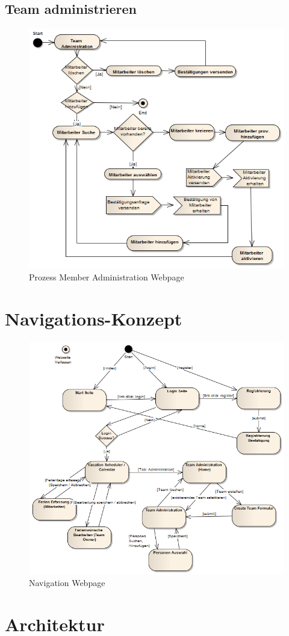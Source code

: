 \subsection{Team administrieren}
 \begin{figure}[H]
  	\centering
    	\includegraphics[width=15cm]{images/process_team_administration}
 	\caption{Prozess Member Administration Webpage}
\end{figure}





\section{Navigations-Konzept}\label{konzept:navigation}
 \begin{figure}[H]
  	\centering
    	\includegraphics[width=13cm]{images/navigation_process}
 	\caption{Navigation Webpage}
\end{figure}

\section{Architektur}






